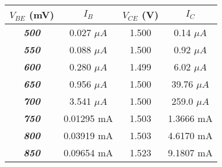 \begin{tabular}{cccc}
\hline
\textbf{$V_{BE}$ (mV)} & \textbf{$I_{B}$ } & \textbf{$V_{CE}$ (V)} & \textbf{$I_{C}$ } \\ \hline
\textit{\textbf{500}} & 0.027 $\mu A$& 1.500  & 0.14 $\mu A$ \\
\textit{\textbf{550}} & 0.088 $\mu A$& 1.500  &0.92  $\mu A$ \\
\textit{\textbf{600}} & 0.280 $\mu A$& 1.499  & 6.02  $\mu A$ \\
\textit{\textbf{650}} & 0.956 $\mu A$&1.500  & 39.76 $\mu A$ \\
\textit{\textbf{700}} & 3.541 $\mu A$ & 1.500  & 259.0 $\mu A$\\
\textit{\textbf{750}} & 0.01295 mA & 1.503  & 1.3666 mA\\
\textit{\textbf{800}} & 0.03919 mA & 1.503  & 4.6170 mA\\
\textit{\textbf{850}} & 0.09654 mA  & 1.523  & 9.1807  mA\\\hline
\end{tabular}